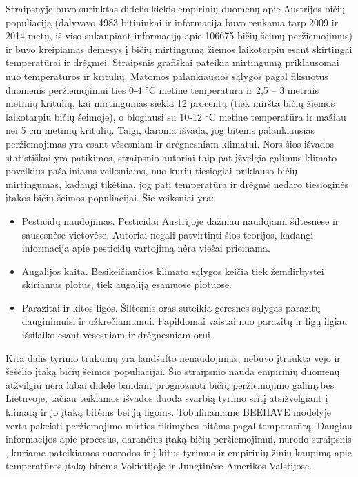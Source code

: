 \documentclass{VUMIFPSmagistrinis}
\begin{document}
Straipsnyje \cite{SCT17}  buvo surinktas didelis kiekis empirinių duomenų apie Austrijos bičių populiaciją (dalyvavo 4983 bitininkai ir informacija buvo renkama tarp 2009 ir 2014 metų, iš viso sukaupiant informaciją apie 106675 bičių šeimų peržiemojimus) ir buvo kreipiamas dėmesys į bičių mirtingumą žiemos laikotarpiu esant skirtingai temperatūrai ir drėgmei.
Straipsnis grafiškai pateikia mirtingumą priklausomai nuo temperatūros ir kritulių. Matomos palankiausios sąlygos pagal fiksuotus duomenis peržiemojimui ties 0-4 °C metine temperatūra ir 2,5 – 3 metrais metinių kritulių, kai mirtingumas siekia 12 procentų (tiek miršta bičių žiemos laikotarpiu bičių šeimoje), o blogiausi su 10-12 °C metine temperatūra ir mažiau nei 5 cm metinių kritulių. Taigi, daroma išvada, jog bitėms palankiausias peržiemojimas yra esant vėsesniam ir drėgnesniam klimatui.
Nors šios išvados statistiškai yra patikimos, straipsnio autoriai taip pat įžvelgia galimus klimato poveikius pašaliniams veiksniams, nuo kurių tiesiogiai priklauso bičių mirtingumas, kadangi tikėtina, jog pati temperatūra ir drėgmė nedaro tiesioginės įtakos bičių šeimos populiacijai. Šie veiksniai yra:
\begin{itemize}
    \item 	Pesticidų naudojimas. Pesticidai Austrijoje dažniau naudojami šiltesnėse ir sausesnėse vietovėse. Autoriai negali patvirtinti šios teorijos, kadangi informacija apie pesticidų vartojimą nėra viešai prieinama.
    \item Augalijos kaita. Besikeičiančios klimato sąlygos keičia tiek žemdirbystei skiriamus plotus, tiek augaliją esamuose plotuose.
    \item 	Parazitai ir kitos ligos. Šiltesnis oras suteikia geresnes sąlygas parazitų dauginimuisi ir užkrečiamumui. Papildomai vaistai nuo parazitų ir ligų ilgiau išsilaiko esant vėsesniam ir drėgnesniam orui.
\end{itemize}

Kita dalis tyrimo trūkumų yra landšafto nenaudojimas, nebuvo įtraukta vėjo ir šešėlio įtaką bičių šeimos populiacijai. Šio straipsnio nauda empirinių duomenų atžvilgiu nėra labai didelė bandant prognozuoti bičių peržiemojimo galimybes Lietuvoje, tačiau teikiamos išvados duoda svarbią tyrimo sritį atsižvelgiant į klimatą ir jo įtaką bitėms bei jų ligoms. Tobulinamame BEEHAVE modelyje verta pakeisti peržiemojimo mirties tikimybes bitėms pagal temperatūrą.
Daugiau informacijos apie procesus, darančius įtaką bičių peržiemojimui, nurodo straipsnis \cite{DFG15}, kuriame pateikiamos nuorodos ir į kitus tyrimus ir empirinių žinių kaupimą apie temperatūros įtaką bitėms Vokietijoje ir Jungtinėse Amerikos Valstijose.
\end{document}

